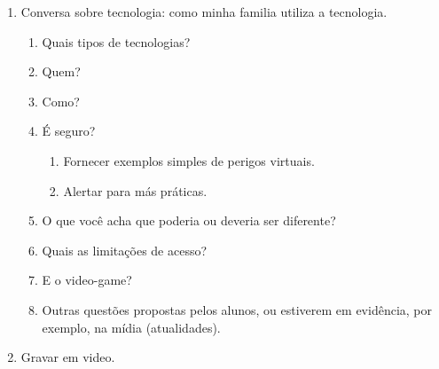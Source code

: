 \begin{enumerate}
	\item Conversa sobre tecnologia: como minha familia utiliza a tecnologia.
	\begin{enumerate}
		\item Quais tipos de tecnologias?
		\item Quem?
		\item Como?
		\item É seguro?
		\begin{enumerate}
			\item Fornecer exemplos simples de perigos virtuais.
			\item Alertar para más práticas.
		\end{enumerate}
		\item O que você acha que poderia ou deveria ser diferente?
		\item Quais as limitações de acesso?
		\item E o video-game?
		\item Outras questões propostas pelos alunos, ou estiverem em evidência, por exemplo, na mídia (atualidades).
	\end{enumerate}
	\item Gravar em video.
\end{enumerate}

